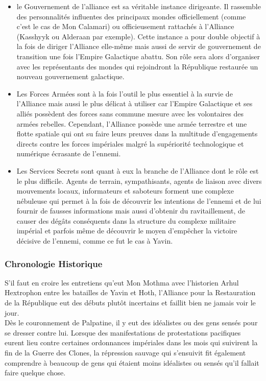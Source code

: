\documentclass[twoside]{article}
\begin{document}
\begin{itemize}
	\item le Gouvernement de l'alliance est sa véritable instance dirigeante. Il rassemble des personnalités influentes des principaux mondes officiellement (comme c'est le cas de Mon Calamari) ou officieusement rattachés à l'Alliance (Kasshyyk ou Alderaan par exemple). Cette instance a pour double objectif à la fois de diriger l'Alliance elle-même mais aussi de servir de gouvernement de transition une fois l'Empire Galactique abattu. Son rôle sera alors d'organiser avec les représentants des mondes qui rejoindront la République restaurée un nouveau gouvernement galactique.
	\item Les Forces Armées sont à la fois l'outil le plus essentiel à la survie de l'Alliance mais aussi le plus délicat à utiliser car l'Empire Galactique et ses alliés possèdent des forces sans commune mesure avec les volontaires des armées rebelles. Cependant, l'Alliance possède une armée terrestre et une flotte spatiale qui ont su faire leurs preuves dans la multitude d'engagements directs contre les forces impériales malgré la supériorité technologique et numérique écrasante de l'ennemi.
	\item Les Services Secrets sont quant à eux la branche de l'Alliance dont le rôle est le plus difficile. Agents de terrain, sympathisants, agents de liaison avec divers mouvements locaux, informateurs et saboteurs forment une complexe nébuleuse qui permet à la fois de découvrir les intentions de l'ennemi et de lui fournir de fausses informations mais aussi d'obtenir du ravitaillement, de causer des dégâts conséquents dans la structure du complexe militaire impérial et parfois même de découvrir le moyen d'empêcher la victoire décisive de l'ennemi, comme ce fut le cas à Yavin. 
\end{itemize}

\subsubsection{Chronologie Historique}
S'il faut en croire les entretiens qu'eut Mon Mothma avec l'historien Arhul Hextrophon entre les batailles de Yavin et Hoth, l'Alliance pour la Restauration de la République eut des débuts plutôt incertains et faillit bien ne jamais voir le jour.\\

Dès le couronnement de Palpatine, il y eut des idéalistes ou des gens sensés pour se dresser contre lui. Lorsque des manifestations de protestations pacifiques eurent lieu contre certaines ordonnances impériales dans les mois qui suivirent la fin de la Guerre des Clones, la répression sauvage qui s'ensuivit fit également comprendre à beaucoup de gens qui étaient moins idéalistes ou sensés qu'il fallait faire quelque chose.\\
\end{document}
